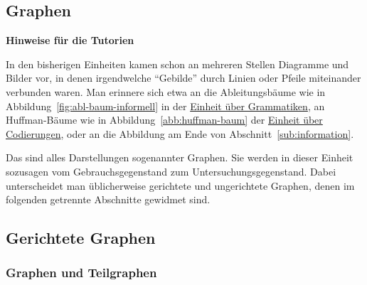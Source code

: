 \begin{extract*}
  \chapter{Graphen}
\end{extract*}
\label{k:graphen} 

\begin{extract}
  \begin{center}\Large\bfseries Hinweise f\"ur die Tutorien\end{center}
\end{extract}

In den bisherigen Einheiten kamen schon an mehreren Stellen Diagramme
und Bilder vor, in denen irgendwelche "`Gebilde"' durch Linien oder
Pfeile miteinander verbunden waren.
% 
Man erinnere sich etwa an die Ableitungsbäume wie in
Abbildung~\ref{fig:abl-baum-informell} in der
\hyperref[k:grammatiken]{Einheit über Grammatiken}, an Huffman-Bäume
wie in Abbildung~\ref{abb:huffman-baum} der
\hyperref[k:codierungen]{Einheit über Codierungen}, oder an die
Abbildung am Ende von Abschnitt~\ref{sub:information}.

Das sind alles Darstellungen sogenannter Graphen.
% 
Sie werden in dieser Einheit sozusagen vom Gebrauchsgegenstand zum
Untersuchungsgegenstand.
% 
Dabei unterscheidet man üblicherweise gerichtete und ungerichtete
Graphen, denen im folgenden getrennte Abschnitte gewidmet sind.

\begin{extract*}
  \section{Gerichtete Graphen}
\end{extract*}
\label{sub:digraph}

\begin{extract*}
  \subsection{Graphen und Teilgraphen}
\end{extract*}
\label{subsub:graphen-teilgraphen}

